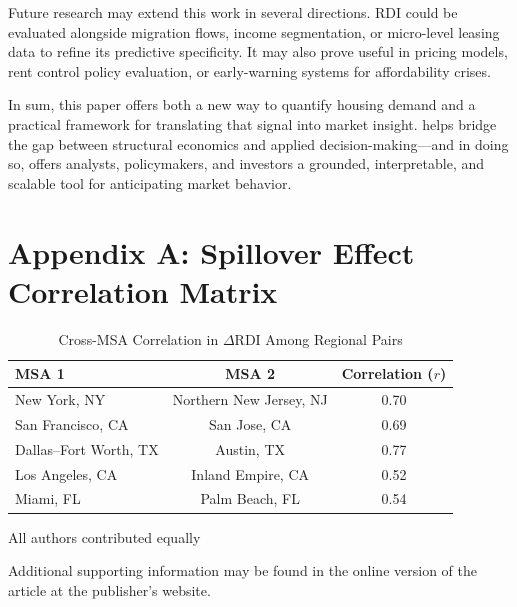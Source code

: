 \documentclass[APA,Times1COL]{WileyNJDv5} %
\begin{document}
Future research may extend this work in several directions. RDI could be evaluated alongside migration flows, income segmentation, or micro-level leasing data to refine its predictive specificity. It may also prove useful in pricing models, rent control policy evaluation, or early-warning systems for affordability crises.

In sum, this paper offers both a new way to quantify housing demand and a practical framework for translating that signal into market insight.  helps bridge the gap between structural economics and applied decision-making—and in doing so, offers analysts, policymakers, and investors a grounded, interpretable, and scalable tool for anticipating market behavior.

\label{appendix_a}
\section*{Appendix A: Spillover Effect Correlation Matrix}
\begin{table}[h]
	\centering
	\caption{Cross-MSA Correlation in $\Delta \text{RDI}$ Among Regional Pairs}
	\label{tab:regional_corr}
	\begin{tabular}{lcc}
		\toprule
		MSA 1 & MSA 2 & Correlation ($r$) \\
		\midrule
		New York, NY & Northern New Jersey, NJ & 0.70 \\
		San Francisco, CA & San Jose, CA & 0.69 \\
		Dallas–Fort Worth, TX & Austin, TX & 0.77 \\
		Los Angeles, CA & Inland Empire, CA & 0.52 \\
		Miami, FL & Palm Beach, FL & 0.54 \\
		\bottomrule
	\end{tabular}
\end{table}


{}

All authors contributed equally










Additional supporting information may be found in the
online version of the article at the publisher’s website.










\nocite{*}%
\end{document}
